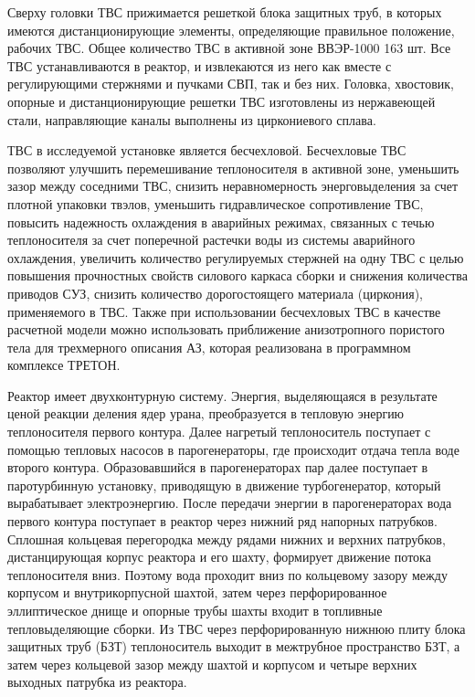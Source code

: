 Сверху головки ТВС прижимается решеткой блока защитных труб, в которых имеются дистанционирующие элементы, определяющие правильное положение, рабочих ТВС. 
Общее количество ТВС в активной зоне ВВЭР-1000 163 шт. Все ТВС устанавливаются в реактор, и извлекаются из него как вместе с регулирующими стержнями и пучками СВП, так и без них. Головка, хвостовик, опорные и дистанционирующие решетки ТВС изготовлены из нержавеющей стали, направляющие каналы выполнены из циркониевого сплава.

ТВС в исследуемой установке является бесчехловой. Бесчехловые ТВС позволяют улучшить перемешивание теплоносителя в активной зоне, уменьшить зазор между соседними ТВС, снизить неравномерность энерговыделения за счет плотной упаковки твэлов, уменьшить гидравлическое сопротивление ТВС, повысить надежность охлаждения в аварийных режимах, связанных с течью теплоносителя за счет поперечной растечки воды из системы аварийного охлаждения, увеличить количество регулируемых стержней на одну ТВС с целью повышения прочностных свойств силового каркаса сборки и снижения количества приводов СУЗ, снизить количество дорогостоящего материала (циркония), применяемого в ТВС. Также при использовании бесчехловых ТВС в качестве расчетной модели можно использовать приближение анизотропного пористого тела для трехмерного описания АЗ, которая реализована в программном комплексе ТРЕТОН.

Реактор имеет двухконтурную систему. Энергия, выделяющаяся в результате ценой реакции деления ядер урана, преобразуется в тепловую энергию теплоносителя первого контура. Далее нагретый теплоноситель поступает с помощью тепловых насосов в парогенераторы, где происходит отдача тепла воде второго контура. Образовавшийся в парогенераторах пар далее поступает в паротурбинную установку, приводящую в движение турбогенератор, который вырабатывает электроэнергию.
% 
После передачи энергии в парогенераторах вода первого контура поступает в реактор через нижний ряд напорных патрубков. Сплошная кольцевая перегородка между рядами нижних и верхних патрубков, дистанцирующая корпус реактора и его шахту, формирует движение потока теплоносителя вниз. Поэтому вода проходит вниз по кольцевому зазору между корпусом и внутрикорпусной шахтой, затем через перфорированное эллиптическое днище и опорные трубы шахты входит в топливные тепловыделяющие сборки. Из ТВС через перфорированную нижнюю плиту блока защитных труб (БЗТ) теплоноситель выходит в межтрубное пространство БЗТ, а затем через кольцевой зазор между шахтой и корпусом и четыре верхних выходных патрубка из реактора.

